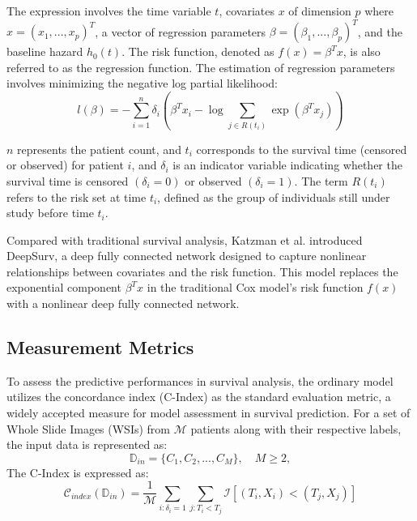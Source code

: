 \documentclass[journal,twoside,web]{ieeecolor}
\begin{document}
The expression involves the time variable $t$, covariates $x$ of dimension $p$ where $x=(x_1,...,x_p)^T$, a vector of regression parameters $\beta=(\beta_1,...,\beta_p)^T$, and the baseline hazard $h_0(t)$. The risk function, denoted as $f(x)=\beta^Tx$, is also referred to as the regression function. The estimation of regression parameters involves minimizing the negative log partial likelihood:
\begin{equation}
    l(\beta) = -\sum_{i=1}^n \delta_i \left( \beta^Tx_i - \log\sum_{j\in R(t_i)} \exp(\beta^Tx_j) \right)
\end{equation}

$n$ represents the patient count, and $t_i$ corresponds to the survival time (censored or observed) for patient $i$, and $\delta_i$ is an indicator variable indicating whether the survival time is censored $(\delta_i=0)$ or observed $(\delta_i=1)$. The term $R(t_i)$ refers to the risk set at time $t_i$, defined as the group of individuals still under study before time $t_i$.

Compared with traditional survival analysis, Katzman et al.\cite{jing2019deep} introduced DeepSurv, a deep fully connected network designed to capture nonlinear relationships between covariates and the risk function. This model replaces the exponential component $\beta^Tx$ in the traditional Cox model's risk function $f(x)$ with a nonlinear deep fully connected network. 

\subsection{Measurement Metrics}
To assess the predictive performances in survival analysis, the ordinary model utilizes the concordance index (C-Index) as the standard evaluation metric, a widely accepted measure for model assessment in survival prediction\cite{steck2007ranking}. 
For a set of Whole Slide Images (WSIs) from $\mathcal{M}$ patients along with their respective labels, the input data is represented as: $$\mathbb{D}_{in}=\{C_1,C_2,...,C_M\},\quad M \geq 2,$$
The C-Index\cite{heagerty2005survival} is expressed as:
\begin{equation}\label{c-index-1}
    \mathcal{C}_{index}(\mathbb{D}_{in})=\frac1{\mathcal{M}}\sum_{i:\delta_i=1}\sum_{j:T_i<T_j}\mathcal{I}[(T_i,X_i)<(T_j,X_j)]
\end{equation}
\end{document}
